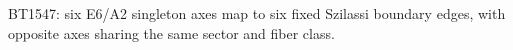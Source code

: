\begin{center}\small
BT1547: six E6/A2 singleton axes map to six fixed Szilassi boundary edges, with opposite axes sharing the same sector and fiber class.
\end{center}
